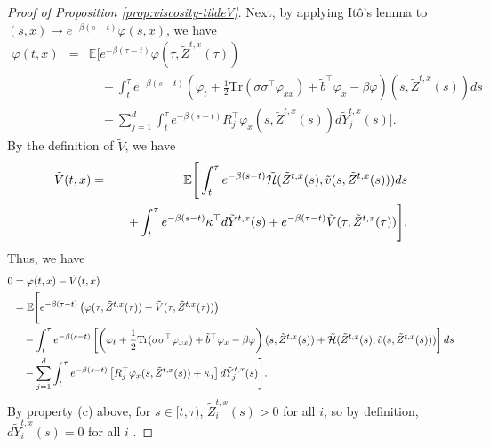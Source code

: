 \documentclass[11pt]{article}
\theoremstyle{definition}
\theoremstyle{plain}
\newcommand{\R}{\mathbb{R}}
\newcommand{\cH}{{\cal H}}
\newcommand{\tb}{\tilde{b}}
\begin{document}
\begin{proof}[Proof of Proposition \ref{prop:viscosity-tildeV}]
Next, by applying Itô's lemma to $(s,x) \mapsto e^{-\beta (s-t)} \varphi(s,x)$, we have
\begin{eqnarray*}
\varphi(t,x) &=& \mathbb{E} \Bigg[ e^{-\beta(\tau - t)} \varphi(\tau, \tilde{Z}^{t,x}(\tau)) \\
&& \quad - \int_t^{\tau} e^{-\beta(s - t)} \left( \varphi_t + \frac{1}{2} \mathrm{Tr}(\sigma \sigma^{\top} \varphi_{xx}) + \tb^{\top} \varphi_x - \beta \varphi \right)(s, \tilde{Z}^{t,x}(s)) ds \\
&& \quad - \sum_{j=1}^d \int_t^{\tau} e^{-\beta(s - t)} R_j^{\top}\varphi_x(s, \tilde{Z}^{t,x}(s)) d\tilde{Y}^{t,x}_j(s) \Bigg].
\end{eqnarray*}
By the definition of $\tilde V$, we have
\begin{eqnarray*}
\tilde{V}(t,x) &=& \mathbb{E} \Bigg[ \int_t^{\tau} e^{-\beta(s - t)} \tilde \cH(\tilde{Z}^{t,x}(s), \tilde{v}(s, \tilde{Z}^{t,x}(s))) ds \\
& & \quad + \int_t^{\tau} e^{-\beta(s - t)} \kappa^{\top}d\tilde{Y}^{t,x}(s) + e^{-\beta(\tau - t)} \tilde{V}(\tau, \tilde{Z}^{t,x}(\tau)) \Bigg].
\end{eqnarray*}
Thus, we have
\begin{align}
0 &= \varphi(t,x) - \tilde{V}(t,x) \nonumber \\
&= \mathbb{E} \Bigg[ e^{-\beta(\tau - t)} \left( \varphi(\tau, \tilde{Z}^{t,x}(\tau)) - \tilde{V}(\tau, \tilde{Z}^{t,x}(\tau)) \right) \nonumber \\
&\quad - \int_t^{\tau} e^{-\beta(s - t)} \left[\left( \varphi_t + \frac{1}{2} \mathrm{Tr}(\sigma \sigma^{\top} \varphi_{xx}) + \tb^{\top} \varphi_x - \beta \varphi \right)(s, \tilde{Z}^{t,x}(s)) 
+ \tilde \cH (\tilde{Z}^{t,x}(s), \tilde{v}(s, \tilde Z^{t,x}(s))) \right] ds \nonumber \\
&\quad - \sum_{j=1}^d \int_t^{\tau} e^{-\beta(s - t)} \left[R_j^{\top} \varphi_x(s, \tilde{Z}^{t,x}(s)) + \kappa_j\right] d\tilde{Y}^{t,x}_j(s) \Bigg].
\label{eq:viscosity1}
\end{align}
By property (c) above, for $s \in [t, \tau)$, $\tilde Z_i^{t,x}(s) > 0$ for all $i$, so by definition, $d\tilde Y_i^{t,x}(s) = 0$ for all $i$ .

\end{proof}
\end{document}
